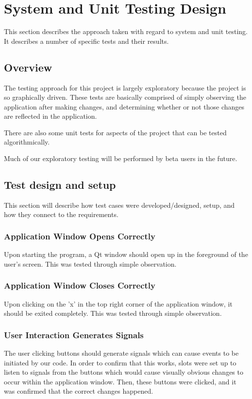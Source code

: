 

\chapter{System and Unit Testing Design}
This section describes the approach taken with regard to system and unit testing. It describes a number of specific tests and their results.  

\section{Overview}
The testing approach for this project is largely exploratory because the project is so graphically driven. These tests are basically comprised of simply observing the application after making changes, and determining whether or not those changes are reflected in the application.

There are also some unit tests for aspects of the project that can be tested algorithmically.

Much of our exploratory testing will be performed by beta users in the future.

\section{Test design and setup}
This section will describe how test cases were developed/designed, setup, and how they connect to the requirements.

\subsection{Application Window Opens Correctly}
Upon starting the program, a Qt window should open up in the foreground of the user's screen. This was tested through simple observation.

\subsection{Application Window Closes Correctly}
Upon clicking on the 'x' in the top right corner of the application window, it should be exited completely. This was tested through simple observation.

\subsection{User Interaction Generates Signals}
The user clicking buttons should generate signals which can cause events to be initiated by our code. In order to confirm that this works, slots were set up to listen to signals from the buttons which would cause visually obvious changes to occur within the application window. Then, these buttons were clicked, and it was confirmed that the correct changes happened.

